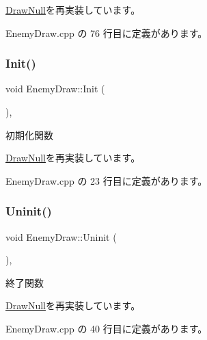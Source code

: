 \mbox{\hyperlink{class_draw_null_a9aac059eb3b5d1f77e8bd3aa0647cff9}{Draw\+Null}}を再実装しています。



 Enemy\+Draw.\+cpp の 76 行目に定義があります。

\mbox{\label{class_enemy_draw_aa1659c35fa757db6a6cf07e26ad9ddfb}} 
\subsubsection{\texorpdfstring{Init()}{Init()}}
{\footnotesize\ttfamily void Enemy\+Draw\+::\+Init (\begin{DoxyParamCaption}{ }\end{DoxyParamCaption})\hspace{0.3cm}{\ttfamily [override]}, {\ttfamily [virtual]}}



初期化関数 



\mbox{\hyperlink{class_draw_null_a20aef1e54c1a158b741bfd731e18efdf}{Draw\+Null}}を再実装しています。



 Enemy\+Draw.\+cpp の 23 行目に定義があります。

\mbox{\label{class_enemy_draw_a2861dc0623b0be7726bc69a6a469190e}} 
\subsubsection{\texorpdfstring{Uninit()}{Uninit()}}
{\footnotesize\ttfamily void Enemy\+Draw\+::\+Uninit (\begin{DoxyParamCaption}{ }\end{DoxyParamCaption})\hspace{0.3cm}{\ttfamily [override]}, {\ttfamily [virtual]}}



終了関数 



\mbox{\hyperlink{class_draw_null_a6e81d63efab7333e8d0e8af99362a4d9}{Draw\+Null}}を再実装しています。



 Enemy\+Draw.\+cpp の 40 行目に定義があります。



